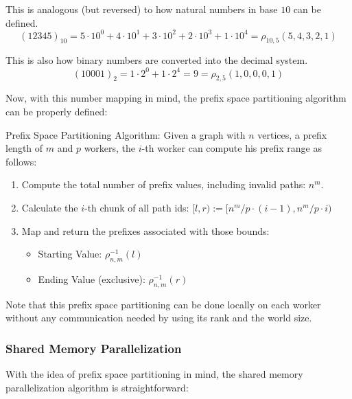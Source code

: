 \begin{example}
    This is analogous (but reversed) to how natural numbers in base $10$ can be defined.
    \[
        (12345)_{10} = 5 \cdot 10^0 + 4 \cdot 10^1 + 3 \cdot 10^2 + 2 \cdot 10^3 + 1 \cdot 10^4 = \rho_{10,5}(5,4,3,2,1)
    \]
\end{example}

\begin{example}
    This is also how binary numbers are converted into the decimal system.
    \[
        (10001)_2 = 1 \cdot 2^0 + 1 \cdot 2^4 = 9 = \rho_{2,5}(1,0,0,0,1)
    \]
\end{example}

Now, with this number mapping in mind, the prefix space partitioning algorithm can be properly defined:
\begin{definition}{Prefix Space Partitioning Algorithm:}
    Given a graph with $n$ vertices, a prefix length of $m$ and $p$ workers, the $i$-th worker can compute his prefix range as follows:
\begin{enumerate}
    \item Compute the total number of prefix values, including invalid paths: $n^m$.
    \item Calculate the $i$-th chunk of all path ids: $[l,r) := [n^m/p \cdot (i-1), n^m/p\cdot i)$
    \item Map and return the prefixes associated with those bounds:
        \begin{itemize}
            \item Starting Value: $\rho_{n,m}^{-1}(l)$
            \item Ending Value (exclusive): $\rho_{n,m}^{-1}(r)$
        \end{itemize}
\end{enumerate}
\end{definition}

\begin{remark}
    Note that this prefix space partitioning can be done locally on each worker without any communication needed by using its rank and the world size.
\end{remark}


\subsubsection{Shared Memory Parallelization}

With the idea of prefix space partitioning in mind, the shared memory parallelization algorithm is straightforward:

